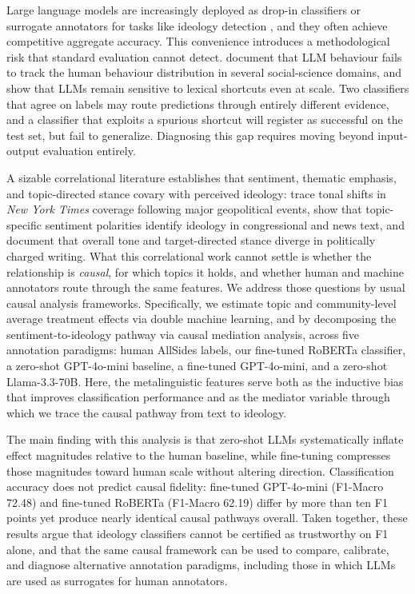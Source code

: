 Large language models are increasingly deployed as drop-in classifiers or surrogate annotators for tasks like ideology detection \citep{wu2023large, horton2023large, li2024frontiers, ma-etal-2025-algorithmic}, and they often achieve competitive aggregate accuracy. This convenience introduces a methodological risk that standard evaluation cannot detect. \citet{gao2025LLMscaution} document that LLM behaviour fails to track the human behaviour distribution in several social-science domains, and \citet{yuan2024llmsovercomeshortcutlearning} show that LLMs remain sensitive to lexical shortcuts even at scale. Two classifiers that agree on labels may route predictions through entirely different evidence, and a classifier that exploits a spurious shortcut will register as successful on the test set, but fail to generalize. Diagnosing this gap requires moving beyond input-output evaluation entirely.

A sizable correlational literature establishes that sentiment, thematic emphasis, and topic-directed stance covary with perceived ideology: \citet{smirnova2017ideology} trace tonal shifts in \textit{New York Times} coverage following major geopolitical events, \citet{bhatia2018topic} show that topic-specific sentiment polarities identify ideology in congressional and news text, and \citet{bestvater2023sentiment} document that overall tone and target-directed stance diverge in politically charged writing. What this correlational work cannot settle is whether the relationship is \emph{causal}, for which topics it holds, and whether human and machine annotators route through the same features. We address those questions by usual causal analysis frameworks. Specifically, we estimate topic and community-level average treatment effects via double machine learning, and by decomposing the sentiment-to-ideology pathway via causal mediation analysis, across five annotation paradigms: human AllSides labels, our fine-tuned RoBERTa classifier, a zero-shot GPT-4o-mini baseline, a fine-tuned GPT-4o-mini, and a zero-shot Llama-3.3-70B. Here, the metalinguistic features serve both as the inductive bias that improves classification performance and as the mediator variable through which we trace the causal pathway from text to ideology.

The main finding with this analysis is that zero-shot LLMs systematically inflate effect magnitudes relative to the human baseline, while fine-tuning compresses those magnitudes toward human scale without altering direction. Classification accuracy does not predict causal fidelity: fine-tuned GPT-4o-mini (F1-Macro 72.48) and fine-tuned RoBERTa (F1-Macro 62.19) differ by more than ten F1 points yet produce nearly identical causal pathways overall. Taken together, these results argue that ideology classifiers cannot be certified as trustworthy on F1 alone, and that the same causal framework can be used to compare, calibrate, and diagnose alternative annotation paradigms, including those in which LLMs are used as surrogates for human annotators.

